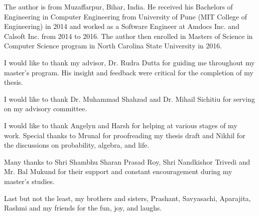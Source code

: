 \begin{biography}
The author is from Muzaffarpur, Bihar, India. He received his Bachelors of Engineering in Computer Engineering from University of Pune (MIT College of Engineering) in 2014 and worked as a Software Engineer at Amdocs Inc. and Calsoft Inc. from 2014 to 2016. The author then enrolled in Masters of Science in Computer Science program in North Carolina State University in 2016.
\end{biography}

\begin{acknowledgements}
I would like to thank my advisor, Dr. Rudra Dutta for guiding me throughout my master's program. His insight and feedback were critical for the completion of my thesis.

I would like to thank Dr. Muhammad Shahzad and Dr. Mihail Sichitiu for serving on my advisory committee. 

I would like to thank Angelyn and Harsh for helping at various stages of my work. Special thanks to Mrunal for proofreading my thesis draft and Nikhil for the discussions on probability, algebra, and life.

Many thanks to Shri Shambhu Sharan Prasad Roy, Shri Nandkishor Trivedi and Mr. Bal Mukund for their support and constant encouragement during my master's studies.

Last but not the least, my brothers and sisters, Prashant, Savyasachi, Aparajita, Rashmi and my friends for the fun, joy, and laughs.

\end{acknowledgements}


\thesistableofcontents

\thesislistoftables

\thesislistoffigures
